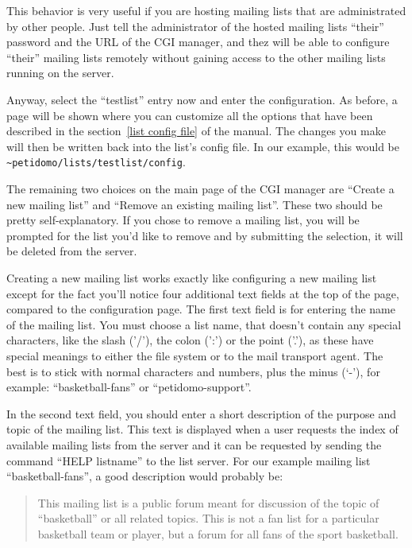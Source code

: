 \documentclass[a4paper]{report}
\newcommand{\file}[1]{{\tt #1}}
\newcommand{\Index}[1]{#1\index{#1}}
\begin{document}
This behavior is very useful if you are hosting mailing lists that are
administrated by other people. Just tell the administrator of the hosted
mailing lists ``their'' password and the URL of the CGI manager, and
thez will be able to configure ``their'' mailing lists
remotely without gaining access to the
other mailing lists running on the server.

Anyway, select the ``testlist'' entry now and enter the configuration.
As before, a page will be shown where you can customize all the
options that have been described in the section~\ref{list config file}
of the manual. The changes you make will then be written back into the
list's config file. In our example, this would be
\file{\~{}petidomo/lists/testlist/config}.

The remaining two choices on the main page of the CGI manager are
``Create a new mailing list'' and ``Remove an existing mailing list''.
These two should be pretty self-explanatory. If you chose to remove a
mailing list, you will be prompted for the list you'd like to remove
and by submitting the selection, it will be deleted from the server.

Creating a new mailing list works exactly like configuring a new
mailing list except for the fact you'll notice four additional text
fields at the top of the page, compared to the configuration page. The
first text field is for entering the name of the mailing list.
 You must choose a list name, that doesn't
contain any special characters, like the slash ('/'), the colon (':')
or the point ('.'), as these have special meanings to either the file
system or to the mail transport agent. The best is to stick with
normal characters and numbers, plus the minus (`-'), for example:
``basketball-fans'' or ``petidomo-support''.

In the second text field, you should enter a short \Index{description}
of the purpose and topic of the mailing list. This text is displayed
when a user requests the index of available mailing lists from the
server and it can be requested by sending the command ``HELP
listname'' to the list server. For our example mailing list
``basketball-fans'', a good description would probably be:

\begin{quotation}

This mailing list is a public forum meant for discussion of the topic
of ``basketball'' or all related topics. This is not a fan list for a
particular basketball team or player, but a forum for all fans of the
sport basketball.

\end{quotation}
\end{document}
